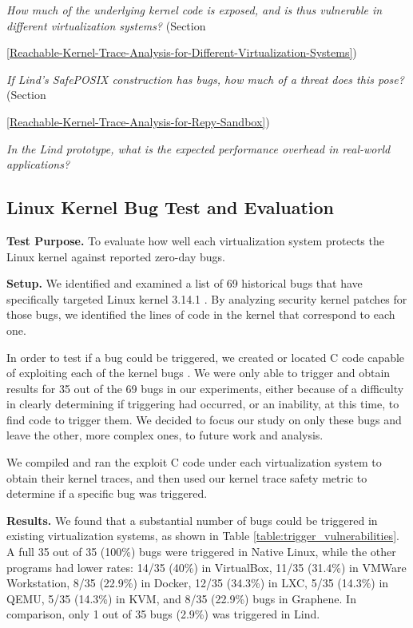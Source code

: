\textit{How much of the underlying kernel code is exposed, and is thus
vulnerable in different virtualization systems?}
(Section~{{\ref{Reachable-Kernel-Trace-Analysis-for-Different-Virtualization-Systems}})

\textit{If Lind's SafePOSIX construction has bugs, how much of a threat does this pose?}
(Section~{{\ref{Reachable-Kernel-Trace-Analysis-for-Repy-Sandbox}})

\textit{In the Lind prototype, what is the expected performance overhead in
real-world applications?}


\subsection{Linux Kernel Bug Test and Evaluation}
\label{Linux-Kernel-Bug-Test-and-Evaluation}

\textbf{Test Purpose.}
To evaluate how well each virtualization system protects the Linux kernel
against reported zero-day bugs.

\noindent
\textbf{Setup.}
We identified and examined a list of 69 historical bugs that have
specifically targeted Linux kernel 3.14.1 \cite{CVE-Datasource}.
By analyzing security kernel patches for those bugs,
we identified the lines of code in the kernel that correspond to each one.

In order to test if a bug could be triggered, we created or located C
code capable of exploiting each of the kernel bugs \cite{Exploit-Database}.
We were only able to trigger and obtain results for 35 out of the 69 bugs in our experiments,
either because of a difficulty in clearly determining if triggering had occurred, or an inability,
at this time, to find code to trigger them. We decided to focus our study on
only these bugs and leave the other, more complex ones, to future work and analysis.

We compiled and ran the exploit C code under each virtualization system to
obtain their kernel traces, and then used our kernel trace safety metric to
determine if a specific bug was triggered.

\noindent
\textbf{Results.}
We found that a substantial number of bugs could be triggered in existing
virtualization systems, as shown in Table \ref{table:trigger_vulnerabilities}.
A full 35 out of 35 (100\%) bugs were triggered in Native Linux,
while the other programs had lower rates: 14/35 (40\%) in
VirtualBox,
11/35 (31.4\%)  in VMWare Workstation, 8/35 (22.9\%)  in Docker,
12/35 (34.3\%)  in LXC, 5/35 (14.3\%)  in QEMU, 5/35 (14.3\%)  in KVM,
and 8/35 (22.9\%) bugs in Graphene.
In comparison, only 1 out of 35 bugs  (2.9\%) was triggered in Lind.

}}
